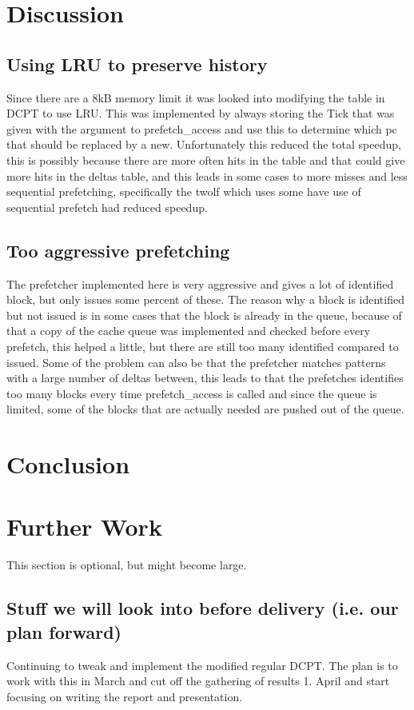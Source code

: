 \documentclass[12pt,journal,compsoc]{IEEEtran}
\begin{document}
\section{Discussion}
\subsection{Using LRU to preserve history}
Since there are a 8kB memory limit it was looked into modifying the table in DCPT to use LRU. This was implemented by always storing the Tick that was given with the argument to prefetch\_access and use this to determine which pc that should be replaced by a new. Unfortunately this reduced the total speedup, this is possibly because there are more often hits in the table and that could give more hits in the deltas table, and this leads in some cases to more misses and less sequential prefetching, specifically the twolf which uses some have use of sequential prefetch had reduced speedup.

\subsection{Too aggressive prefetching}
The prefetcher implemented here is very aggressive and gives a lot of identified block, but only issues some percent of these. The reason why a block is identified but not issued is in some cases that the block is already in the queue, because of that a copy of the cache queue was implemented and checked before every prefetch, this helped a little, but there are still too many identified compared to issued. Some of the problem can also be that the prefetcher matches patterns with a large number of deltas between, this leads to that the prefetches identifies too many blocks every time prefetch\_access is called and since the queue is limited, some of the blocks that are actually needed are pushed out of the queue. %
\section{Conclusion}

\section{Further Work}
This section is optional, but might become large.

\subsection{Stuff we will look into before delivery (i.e. our plan forward)}
Continuing to tweak and implement the modified regular DCPT. The plan is
to work with this in March and cut off the gathering of results 1. April
and start focusing on writing the report and presentation.
\end{document}
